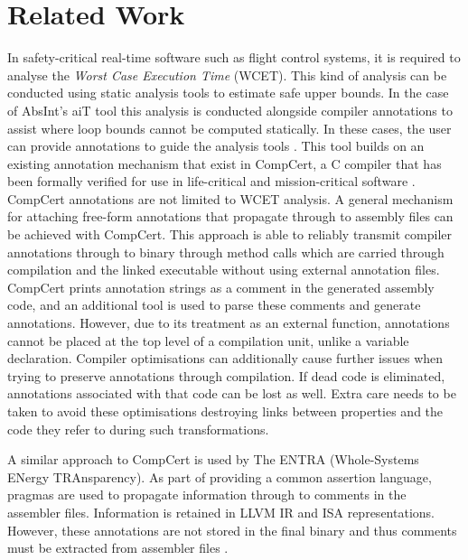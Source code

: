 \documentclass[twocolumn]{article}
\begin{document}
\section{Related Work}
In safety-critical real-time software such as flight control systems, it is required to analyse the \textit{Worst Case Execution Time} (WCET). This kind of analysis can be conducted using static analysis tools to estimate safe upper bounds. In the case of AbsInt's aiT tool this analysis is conducted alongside compiler annotations to assist where loop bounds cannot be computed statically. In these cases, the user can provide annotations to guide the analysis tools \cite{schommer2018embedded}. This tool builds on an existing annotation mechanism that exist in CompCert, a C compiler that has been formally verified for use in life-critical and mission-critical software \cite{compcert}\cite{leroy2016compcert}. CompCert annotations are not limited to WCET analysis. A general mechanism for attaching free-form annotations that propagate through to assembly files can be achieved with CompCert. This approach is able to reliably transmit compiler annotations through to binary through method calls which are carried through compilation and the linked executable without using external annotation files. CompCert prints annotation strings as a comment in the generated assembly code, and an additional tool is used to parse these comments and generate annotations. However, due to its treatment as an external function, annotations cannot be placed at the top level of a compilation unit, unlike a variable declaration. Compiler optimisations can additionally cause further issues when trying to preserve annotations through compilation. If dead code is eliminated, annotations associated with that code can be lost as well. Extra care needs to be taken to avoid these optimisations destroying links between properties and the code they refer to during such transformations.

A similar approach to CompCert is used by The ENTRA (Whole-Systems ENergy TRAnsparency). As part of providing a common assertion language, pragmas are used to propagate information through to comments in the assembler files. Information is retained in LLVM IR and ISA representations. However, these annotations are not stored in the final binary and thus comments must be extracted from assembler files \cite{eder2013common}.
\end{document}

